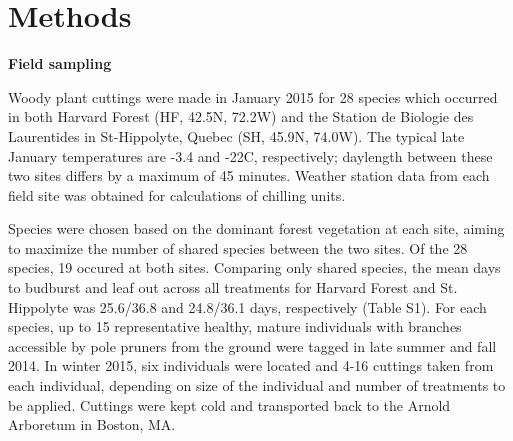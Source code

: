 \documentclass[12pt]{article}
\begin{document}

\section*{Methods}

\textbf{Field sampling}

Woody plant cuttings were made in January 2015 for 28 species which occurred in both Harvard Forest (HF, 42.5\degree N, 72.2\degree W) and the Station de Biologie des Laurentides in St-Hippolyte, Quebec (SH, 45.9\degree N, 74.0\degree W). The typical late January temperatures are -3.4 and -22\degree C, respectively; daylength between these two sites differs by a maximum of 45 minutes. Weather station data from each field site was obtained for calculations of chilling units. 

Species were chosen based on the dominant forest vegetation at each site, aiming to maximize the number of shared species between the two sites. Of the 28 species, 19 occured at both sites. Comparing only shared species, the mean days to budburst and leaf out across all treatments for Harvard Forest and St. Hippolyte was 25.6/36.8 and 24.8/36.1 days, respectively (Table S1). For each species, up to 15 representative healthy, mature individuals with branches accessible by pole pruners from the ground were tagged in late summer and fall 2014. In winter 2015, six individuals were located and 4-16 cuttings taken from each individual, depending on size of the individual and number of treatments to be applied. Cuttings were kept cold and transported back to the Arnold Arboretum in Boston, MA.
\end{document}
